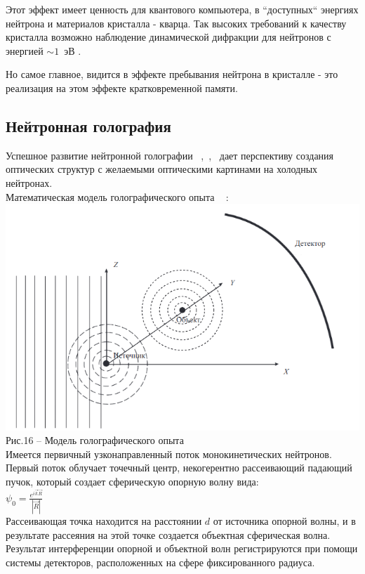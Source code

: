 \documentclass[11pt]{report}
\begin{document}
Этот эффект имеет ценность для квантового компьютера, в ``доступных`` энергиях нейтрона и материалов кристалла - кварца. Так высоких требований к качеству кристалла возможно наблюдение динамической дифракции для нейтронов с энергией $\sim 1$~эВ .

Но самое главное, видится в эффекте пребывания нейтрона в кристалле - это реализация на этом эффекте кратковременной памяти.

\subsection{Нейтронная голография}
Успешное развитие нейтронной голографии ~\cite{ng_1},~\cite{ng_2},~\cite{ng_3} дает перспективу создания оптических структур с желаемыми оптическими картинами на холодных нейтронах. \\

Математическая модель голографического опыта ~\cite{ng_1} : \\

\includegraphics[scale=0.6]{ng_1}\\
Рис.16 -- Модель голографического опыта \\

Имеется первичный узконаправленный поток монокинетических нейтронов. Первый поток облучает точечный центр, некогерентно рассеивающий падающий пучок, который создает сферическую опорную волну вида: \\

$\psi_0 = \frac{e^{i\overrightarrow{k}\overrightarrow{R}}}{|\overrightarrow{R}|} $\\

Рассеивающая точка находится на расстоянии $d$ от источника опорной волны, и в результате рассеяния на этой точке создается объектная сферическая волна. Результат интерференции опорной и объектной волн регистрируются при помощи системы детекторов, расположенных на сфере фиксированного радиуса. \\
\end{document}
